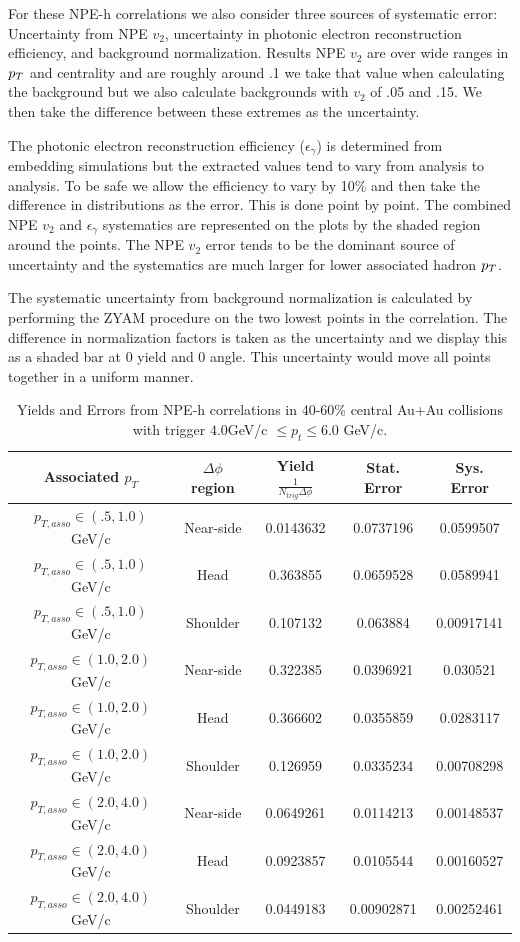 For these NPE-h correlations we also consider three sources of systematic error: Uncertainty from NPE $v_2$, uncertainty in photonic electron reconstruction efficiency, and background normalization. Results NPE $v_2$ are over wide ranges in $p_{T}$ and centrality and are roughly around .1 we take that value when calculating the background but we also calculate backgrounds with $v_2$ of .05 and .15. We then take the difference between these extremes as the uncertainty. 

The photonic electron reconstruction efficiency ($\epsilon_\gamma$) is determined from embedding simulations but the extracted values tend to vary from analysis to analysis. To be safe we allow the efficiency to vary by 10\% and then take the difference in distributions as the error. This is done point by point. The combined NPE $v_2$ and $\epsilon_\gamma$ systematics are represented on the plots by the shaded region around the points. The NPE $v_2$ error tends to be the dominant source of uncertainty and the systematics are much larger for lower associated hadron $p_{T}$.

The systematic uncertainty from background normalization is calculated by performing the ZYAM procedure on the two lowest points in the correlation. The difference in normalization factors is taken as the uncertainty and we display this as a shaded bar at 0 yield and 0 angle. This uncertainty would move all points together in a uniform manner.

\begin{table}
\centering
\begin{tabular}{|c|c|c|c|c|}
\hline
Associated $p_T$	& $\Delta\phi$ region & Yield $\frac{1}{N_{trig} \Delta\phi}$ & Stat. Error & Sys. Error\\
\hline
$p_{T,asso} \in(.5, 1.0)$ GeV/c  & Near-side & 0.0143632 & 0.0737196 & 0.0599507 \\
\hline
$p_{T,asso} \in(.5, 1.0)$ GeV/c  & Head & 0.363855 & 0.0659528 & 0.0589941 \\
\hline
$p_{T,asso} \in(.5, 1.0)$ GeV/c  & Shoulder & 0.107132 & 0.063884 & 0.00917141 \\
\hline
$p_{T,asso} \in(1.0, 2.0)$ GeV/c  & Near-side & 0.322385 & 0.0396921 & 0.030521 \\
\hline
$p_{T,asso} \in(1.0, 2.0)$ GeV/c  & Head & 0.366602 & 0.0355859 & 0.0283117 \\
\hline
$p_{T,asso} \in(1.0, 2.0)$ GeV/c  & Shoulder & 0.126959 & 0.0335234 & 0.00708298 \\
\hline
$p_{T,asso} \in(2.0, 4.0)$ GeV/c  & Near-side & 0.0649261 & 0.0114213 & 0.00148537 \\
\hline
$p_{T,asso} \in(2.0, 4.0)$ GeV/c  & Head & 0.0923857 & 0.0105544 & 0.00160527 \\
\hline
$p_{T,asso} \in(2.0, 4.0)$ GeV/c  & Shoulder & 0.0449183 & 0.00902871 & 0.00252461 \\
\hline
\end{tabular}
\caption[Yields and Errors in Au+Au Correlations, 40-60\%, Low Trigger]{Yields and Errors from NPE-h correlations in 40-60\% central Au+Au collisions with trigger $4.0 $GeV/c $\leq p_t \leq 6.0$ GeV/c.}
\label{tab:AuAuYieldPeriLow}
\end{table} 

